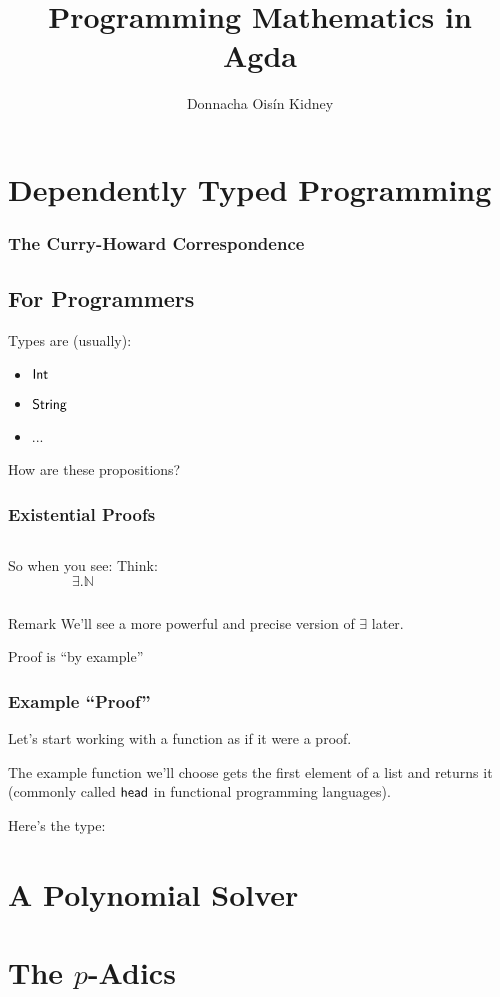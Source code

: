 \documentclass[draft,usenames,dvipsnames]{beamer}
\title{Programming Mathematics in Agda}
\author{Donnacha Oisín Kidney}
\begin{document}

\section{Dependently Typed Programming}
\begin{frame}[fragile]
  \frametitle{The Curry-Howard Correspondence}
  \begin{figure}
    \centering
  \end{figure}

\end{frame}
\subsection{For Programmers}
\begin{frame}
  Types are (usually):
  \begin{itemize}
    \item \(\AgdaDatatype{Int}\)
    \item \(\AgdaDatatype{String}\)
    \item ...
  \end{itemize}

  How are these propositions?
\end{frame}
\begin{frame}[fragile]
  \frametitle{Existential Proofs}
  \begin{columns}[T]
    \centering
    So when you see:
    \centering
    Think:
    \[\exists. \mathbb{N}\]
  \end{columns}

  \begin{block}{Remark}
    We'll see a more powerful and precise version of \(\exists\) later.
  \end{block}

  Proof is ``by example''

\end{frame}
\begin{frame}[fragile]
  \frametitle{Example ``Proof''}
  Let's start working with a function as if it were a proof.

  The example function we'll choose gets the first element of a list and returns
  it (commonly called \(\AgdaFunction{head}\) in functional programming
  languages).

  Here's the type:
\end{frame}
\section{A Polynomial Solver}
\section{The \(p\)-Adics}
\end{document}
